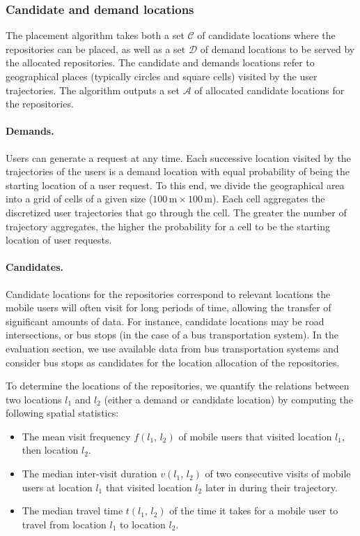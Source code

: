 \subsubsection{Candidate and demand locations}

The placement algorithm takes both a set $\mathcal{C}$ of candidate locations where the repositories can be placed, as well as a set $\mathcal{D}$ of demand locations to be served by the allocated repositories. The candidate and demands locations refer to geographical places (typically circles and square cells) visited by the user trajectories. The algorithm outputs a set $\mathcal{A}$ of allocated candidate locations for the repositories.

\paragraph{Demands.} 
Users can generate a request at any time. Each successive location visited by the trajectories of the users is a demand location with equal probability of being the starting location of a user request. To this end, we divide the geographical area into a grid of cells of a given size (\eg $100\,\textrm{m}\times 100\,\textrm{m}$). Each cell aggregates the discretized user trajectories that go through the cell. The greater the number of trajectory aggregates, the higher the probability for a cell to be the starting location of user requests.

\paragraph{Candidates.} 
Candidate locations for the repositories correspond to relevant locations the mobile users will often visit for long periods of time, allowing the transfer of significant amounts of data. For instance, candidate locations may be road intersections, or bus stops (\eg in the case of a bus transportation system). In the evaluation section, we use available data from bus transportation systems and consider bus stops as candidates for the location allocation of the repositories.

To determine the locations of the repositories, we quantify the relations between two locations $l_1$ and $l_2$ (either a demand or candidate location) by computing the following spatial statistics:

\begin{itemize}

    \item The mean visit frequency $f(l_1,\,l_2)$ of mobile users that visited location $l_1$, then location $l_2$.

    \item The median inter-visit duration $v(l_1,\,l_2)$ of two consecutive visits of mobile users at location $l_1$ that visited location $l_2$ later in during their trajectory.

    \item The median travel time $t(l_1,\,l_2)$ of the time it takes for a mobile user to travel from location $l_1$ to location $l_2$.

\end{itemize}

